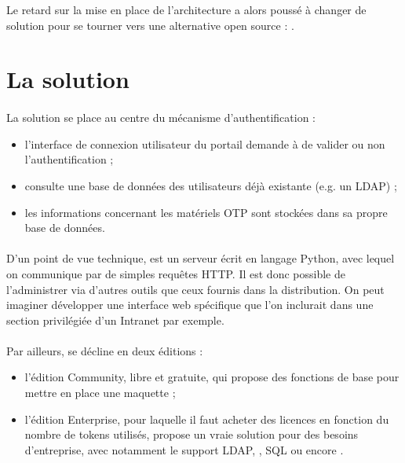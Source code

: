 Le retard sur la mise en place de l'architecture a alors poussé \asmile{} à changer de solution pour se tourner vers une alternative open source : \alinotp{}.


\section{La solution \alinotp{}}

\paragraph{}
La solution \alinotp{} se place au centre du mécanisme d'authentification :

\begin{itemize}
	\item l'interface de connexion utilisateur du portail demande à \alinotp{} de valider ou non l'authentification ;
	\item \alinotp{} consulte une base de données des utilisateurs déjà existante (e.g. un LDAP) ;
	\item les informations concernant les matériels OTP sont stockées dans sa propre base de données.
\end{itemize}

\paragraph{}
D'un point de vue technique, \alinotp{} est un serveur écrit en langage Python, avec lequel on communique par de simples requêtes HTTP.
Il est donc possible de l'administrer via d'autres outils que ceux fournis dans la distribution.
On peut imaginer développer une interface web spécifique que l'on inclurait dans une section privilégiée d'un Intranet par exemple.

\paragraph{}
Par ailleurs, \alinotp{} se décline en deux éditions :

\begin{itemize}
	\item l'édition Community, libre et gratuite, qui propose des fonctions de base pour mettre en place une maquette ;
	\item l'édition Enterprise, pour laquelle il faut acheter des licences en fonction du nombre de tokens utilisés, propose un vraie solution pour des besoins d'entreprise, avec notamment le support LDAP, \aad{}, SQL ou encore \afreerad{}.
\end{itemize}

